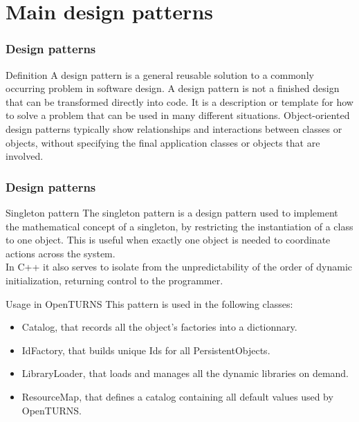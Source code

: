 \documentclass[8pt]{beamer}
\begin{document}
\section[Main design patterns]{Main design patterns}
\begin{frame}
  \frametitle{Design patterns}
  \begin{block}{Definition}
    A \alert{design pattern} is a general reusable solution to a commonly occurring problem in software design. A design pattern is not a finished design that can be transformed directly into code. It is a description or template for how to solve a problem that can be used in many different situations. Object-oriented design patterns typically show relationships and interactions between classes or objects, without specifying the final application classes or objects that are involved.
  \end{block}
\end{frame}
\begin{frame}
  \frametitle{Design patterns}
  \begin{block}{Singleton pattern}
    The \alert{singleton pattern} is a design pattern used to implement the mathematical concept of a singleton, by restricting the instantiation of a class to one object. This is useful when exactly one object is needed to coordinate actions across the system.\\
    In C++ it also serves to isolate from the unpredictability of the order of dynamic initialization, returning control to the programmer.
  \end{block}
  \begin{block}{Usage in OpenTURNS}
    This pattern is used in the following classes:
    \begin{itemize}
    \item \alert{Catalog}, that records all the object's factories into a dictionnary.
    \item \alert{IdFactory}, that builds unique Ids for all PersistentObjects.
    \item \alert{LibraryLoader}, that loads and manages all the dynamic libraries on demand.
    \item \alert{ResourceMap}, that defines a catalog containing all default values used by OpenTURNS.
    \end{itemize}
  \end{block}
\end{frame}
\end{document}
